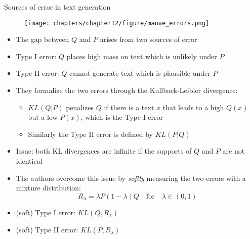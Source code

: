 
\begin{vbframe}{Sources of error in text generation}

\hspace{}

\begin{figure}
    \centering
    \texttt{[image: chapters/chapter12/figure/mauve\_errors.png]}
\end{figure}

\begin{itemize}
    \item The gap between $Q$ and $P$ arises from two sources of error
    \item Type I error: $Q$ places high mass on text which is unlikely under $P$
    \item Type II error: $Q$ cannot generate text which is plausible under $P$
\end{itemize}

\hspace{}

\begin{itemize}
    \item They formalize the two errors through the Kullback-Leibler divergence:
        \begin{itemize}
            \item $KL(Q|P)$ penalizes $Q$ if there is a text $x$ that leads to a high $Q(x)$ but a low $P(x)$, which is the Type I error
            \item Similarly the Type II error is defined by $KL(P|Q)$
        \end{itemize}
    \item Issue: both KL divergences are infinite if the supports of $Q$ and $P$ are not identical
    \item The authors overcome this issue by \textit{softly} measuring the two errors with a mixture distribution: 
    $$R_{\lambda} = \lambda P (1-\lambda) Q \quad \text{for} \quad \lambda \in (0,1)$$
    \item (soft) Type I error: $KL(Q,R_{\lambda})$
    \item (soft) Type II error: $KL(P,R_{\lambda})$
\end{itemize}

\end{vbframe}


